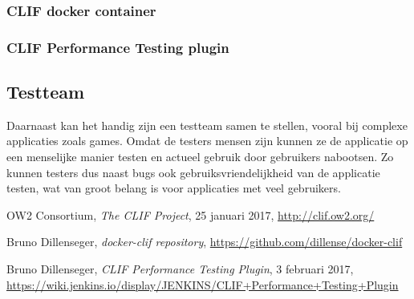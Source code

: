 \documentclass[12pt]{article}
\begin{document}
\subsubsection{CLIF docker container}


\subsubsection{CLIF Performance Testing plugin}




\subsection{Testteam}
Daarnaast kan het handig zijn een testteam samen te stellen, vooral bij complexe applicaties zoals games. Omdat de testers mensen zijn kunnen ze de applicatie op een menselijke manier testen en actueel gebruik door gebruikers nabootsen. Zo kunnen testers dus naast bugs ook gebruiksvriendelijkheid van de applicatie testen, wat van groot belang is voor applicaties met veel gebruikers.

\begin{thebibliography}{9}
	OW2 Consortium,
	\textit{The CLIF Project},
	25 januari 2017,
	\url{http://clif.ow2.org/}
	
	Bruno Dillenseger,
	\textit{docker-clif repository},
	\url{https://github.com/dillense/docker-clif}
	
	Bruno Dillenseger,
	\textit{CLIF Performance Testing Plugin},
	3 februari 2017,
	\url{https://wiki.jenkins.io/display/JENKINS/CLIF+Performance+Testing+Plugin}
\end{thebibliography}
\end{document}
